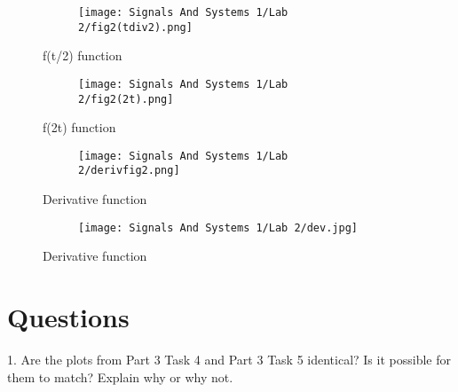 \documentclass[12pt,a4paper]{article}
\begin{document}
\begin{figure}[h]
\centering
\begin{subfigure}{ 1\textwidth}
\texttt{[image: Signals And Systems 1/Lab 2/fig2(tdiv2).png]}
\end{subfigure}
\caption{ f(t/2) function}
\label{fig2:image22}
\end{figure}



\newpage



\begin{figure}[h]
\centering
\begin{subfigure}{ 1\textwidth}
\texttt{[image: Signals And Systems 1/Lab 2/fig2(2t).png]}
\end{subfigure}
\caption{ f(2t) function}
\label{fig2:image22}
\end{figure}

\begin{figure}[h]
\centering
\begin{subfigure}{ 1\textwidth}
\texttt{[image: Signals And Systems 1/Lab 2/derivfig2.png]}
\end{subfigure}
\caption{ Derivative function}
\label{fig2:image22}
\end{figure}
\newpage



\begin{figure}[h]
\centering
\begin{subfigure}{ 1\textwidth}
\texttt{[image: Signals And Systems 1/Lab 2/dev.jpg]}
\end{subfigure}
\caption{ Derivative function}
\label{fig2:image22}
\end{figure}













\section{Questions}\label{sec:res}






1. Are the plots from Part 3 Task 4 and Part 3 Task 5 identical? Is it possible for them to
match? Explain why or why not.
\newline
\end{document}
